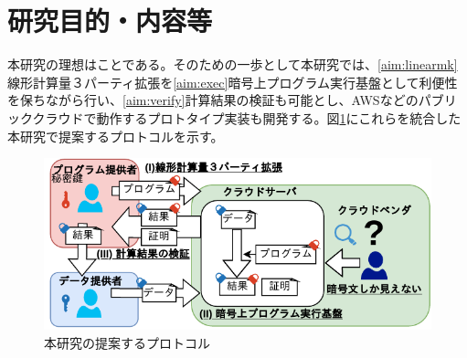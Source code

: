 
\section{研究目的・内容等}


本研究の理想はことである。そのための一歩として本研究では、\ref{aim:linearmk}線形計算量３パーティ拡張を\ref{aim:exec}暗号上プログラム実行基盤として利便性を保ちながら行い、\ref{aim:verify}計算結果の検証も可能とし、AWSなどのパブリッククラウドで動作するプロトタイプ実装も開発する。図\ref{fig:solution}にこれらを統合した本研究で提案するプロトコルを示す。

\begin{figure}[h]
    \centering
    \includegraphics[width=0.8\linewidth]{figures/solution.drawio.pdf}
    \vspace*{-0.5cm}
    \caption{本研究の提案するプロトコル}
    \label{fig:solution}
\end{figure}


